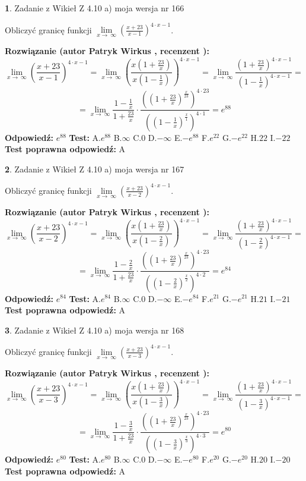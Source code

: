 \documentclass[12pt, a4paper]{article}
\theoremstyle{definition} %
\newtheorem{zad}{}
\newcommand{\zadStart}[1]{\begin{zad}#1\newline}
\newcommand{\zadStop}{\end{zad}}
\newcommand{\rozwStart}[2]{\noindent \textbf{Rozwiązanie (autor #1 , recenzent #2): }\newline}
\newcommand{\rozwStop}{\newline}
\newcommand{\odpStart}{\noindent \textbf{Odpowiedź:}\newline}
\newcommand{\odpStop}{\newline}
\newcommand{\testStart}{\noindent \textbf{Test:}\newline}
\newcommand{\testStop}{\newline}
\newcommand{\kluczStart}{\noindent \textbf{Test poprawna odpowiedź:}\newline}
\newcommand{\kluczStop}{\newline}
\begin{document}
\zadStart{Zadanie z Wikieł Z 4.10 a) moja wersja nr 166}

Obliczyć granicę funkcji  $\lim\limits_{x\to\ \infty}(\frac{x+23}{x-1})^{4\cdot x-1}$.
\zadStop
\rozwStart{Patryk Wirkus}{}
$$\lim\limits_{x\to\ \infty}(\frac{x+23}{x-1})^{4\cdot x-1} = \lim\limits_{x\to\ \infty}(\frac{x(1+\frac{23}{x})}{x(1-\frac{1}{x})})^{4\cdot x-1}=\lim\limits_{x\to\ \infty}\frac{(1+\frac{23}{x})^{4\cdot x-1}}{(1-\frac{1}{x})^{4\cdot x-1}}=$$
$$=\lim\limits_{x\to\ \infty}\frac{1-\frac{1}{x}}{1+\frac{23}{x}}\cdot\frac{((1+\frac{23}{x})^{\frac{x}{23}})^{4\cdot23}}{((1-\frac{1}{x})^{\frac{x}{1}})^{4\cdot1}}=e^{88}$$
\rozwStop
\odpStart
$e^{88}$
\odpStop
\testStart
A.$e^{88}$ B.$\infty$ C.$0$ D.$-\infty$ E.$-e^{88}$
F.$e^{22}$ G.$-e^{22}$
H.$22$
I.$-22$
\testStop
\kluczStart
A
\kluczStop



\zadStart{Zadanie z Wikieł Z 4.10 a) moja wersja nr 167}

Obliczyć granicę funkcji  $\lim\limits_{x\to\ \infty}(\frac{x+23}{x-2})^{4\cdot x-1}$.
\zadStop
\rozwStart{Patryk Wirkus}{}
$$\lim\limits_{x\to\ \infty}(\frac{x+23}{x-2})^{4\cdot x-1} = \lim\limits_{x\to\ \infty}(\frac{x(1+\frac{23}{x})}{x(1-\frac{2}{x})})^{4\cdot x-1}=\lim\limits_{x\to\ \infty}\frac{(1+\frac{23}{x})^{4\cdot x-1}}{(1-\frac{2}{x})^{4\cdot x-1}}=$$
$$=\lim\limits_{x\to\ \infty}\frac{1-\frac{2}{x}}{1+\frac{23}{x}}\cdot\frac{((1+\frac{23}{x})^{\frac{x}{23}})^{4\cdot23}}{((1-\frac{2}{x})^{\frac{x}{2}})^{4\cdot2}}=e^{84}$$
\rozwStop
\odpStart
$e^{84}$
\odpStop
\testStart
A.$e^{84}$ B.$\infty$ C.$0$ D.$-\infty$ E.$-e^{84}$
F.$e^{21}$ G.$-e^{21}$
H.$21$
I.$-21$
\testStop
\kluczStart
A
\kluczStop



\zadStart{Zadanie z Wikieł Z 4.10 a) moja wersja nr 168}

Obliczyć granicę funkcji  $\lim\limits_{x\to\ \infty}(\frac{x+23}{x-3})^{4\cdot x-1}$.
\zadStop
\rozwStart{Patryk Wirkus}{}
$$\lim\limits_{x\to\ \infty}(\frac{x+23}{x-3})^{4\cdot x-1} = \lim\limits_{x\to\ \infty}(\frac{x(1+\frac{23}{x})}{x(1-\frac{3}{x})})^{4\cdot x-1}=\lim\limits_{x\to\ \infty}\frac{(1+\frac{23}{x})^{4\cdot x-1}}{(1-\frac{3}{x})^{4\cdot x-1}}=$$
$$=\lim\limits_{x\to\ \infty}\frac{1-\frac{3}{x}}{1+\frac{23}{x}}\cdot\frac{((1+\frac{23}{x})^{\frac{x}{23}})^{4\cdot23}}{((1-\frac{3}{x})^{\frac{x}{3}})^{4\cdot3}}=e^{80}$$
\rozwStop
\odpStart
$e^{80}$
\odpStop
\testStart
A.$e^{80}$ B.$\infty$ C.$0$ D.$-\infty$ E.$-e^{80}$
F.$e^{20}$ G.$-e^{20}$
H.$20$
I.$-20$
\testStop
\kluczStart
A
\kluczStop
\end{document}
